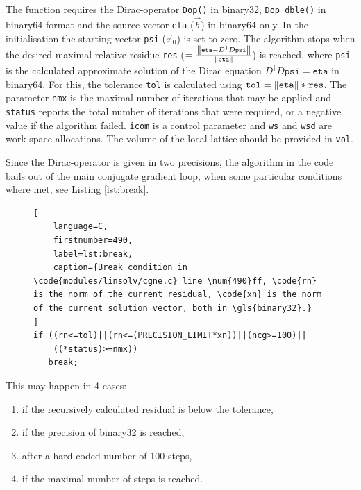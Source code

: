 \documentclass{article}
\theoremstyle{plain} %
\theoremstyle{convention} %
\theoremstyle{remark} %
\def\code#1{\texttt{#1}}
\numberwithin{equation}{section}
\begin{document}
The function requires the Dirac-operator \code{Dop()} in \gls{binary32}, \code{Dop\_dble()} in \gls{binary64} format and the source vector \code{eta} ($\vec{b}$) in \gls{binary64} only. In the initialisation the starting vector \code{psi} ($\vec{x}_0$) is set to zero. The algorithm stops when the desired maximal relative residue \code{res} ($=\frac{\norm{\code{eta}-D^\dagger D \code{psi}}}{\norm{\code{eta}}}$) is reached, where \code{psi} is the calculated approximate solution of the Dirac equation $D^\dagger D \code{psi}=\code{eta}$ in \gls{binary64}. For this, the tolerance \code{tol} is calculated using $\code{tol} = \norm{\code{eta}} * \code{res}$. The parameter \code{nmx} is the maximal number of iterations that may be applied and \code{status} reports the total number of iterations that were required, or a negative value if the algorithm failed. \code{icom} is a control parameter and \code{ws} and \code{wsd} are work space allocations. The volume of the local lattice should be provided in \code{vol}.

Since the Dirac-operator is given in two precisions, the algorithm in the code bails out of the main conjugate gradient loop, when some particular conditions where met, see Listing \ref{lst:break}.

\begin{figure} %
\begin{lstlisting}[
    language=C,
    firstnumber=490,
    label=lst:break,
    caption={Break condition in \code{modules/linsolv/cgne.c} line \num{490}ff, \code{rn} is the norm of the current residual, \code{xn} is the norm of the current solution vector, both in \gls{binary32}.}
]
if ((rn<=tol)||(rn<=(PRECISION_LIMIT*xn))||(ncg>=100)||
    ((*status)>=nmx))
   break;
\end{lstlisting}
\end{figure} 

This may happen in 4 cases:

\begin{enumerate}
  \item if the recursively calculated residual is below the tolerance,
  \item if the precision of \gls{binary32} is reached\footnotemark,
  \item after a hard coded number of \num{100} steps,
  \item if the maximal number of steps is reached.
\end{enumerate}
\end{document}
